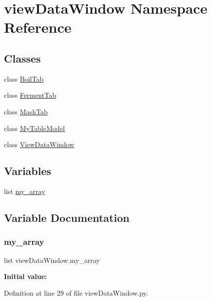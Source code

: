 \hypertarget{namespaceview_data_window}{}\section{view\+Data\+Window Namespace Reference}
\label{namespaceview_data_window}
\subsection*{Classes}
\begin{DoxyCompactItemize}
\item 
class \mbox{\hyperlink{classview_data_window_1_1_boil_tab}{Boil\+Tab}}
\item 
class \mbox{\hyperlink{classview_data_window_1_1_ferment_tab}{Ferment\+Tab}}
\item 
class \mbox{\hyperlink{classview_data_window_1_1_mash_tab}{Mash\+Tab}}
\item 
class \mbox{\hyperlink{classview_data_window_1_1_my_table_model}{My\+Table\+Model}}
\item 
class \mbox{\hyperlink{classview_data_window_1_1_view_data_window}{View\+Data\+Window}}
\end{DoxyCompactItemize}
\subsection*{Variables}
\begin{DoxyCompactItemize}
\item 
list \mbox{\hyperlink{namespaceview_data_window_a7825be9cc716cf57de01f167c3bd5132}{my\+\_\+array}}
\end{DoxyCompactItemize}


\subsection{Variable Documentation}
\mbox{\label{namespaceview_data_window_a7825be9cc716cf57de01f167c3bd5132}} 
\subsubsection{\texorpdfstring{my\_array}{my\_array}}
{\footnotesize\ttfamily list view\+Data\+Window.\+my\+\_\+array}

{\bfseries Initial value\+:}
\begin{DoxyCode}{0}
\DoxyCodeLine{1 =  [(\textcolor{stringliteral}{'1'},\textcolor{stringliteral}{'Carling'},\textcolor{stringliteral}{'01/01/19'}),}
\DoxyCodeLine{4             (\textcolor{stringliteral}{'4'},\textcolor{stringliteral}{'Asahi'},\textcolor{stringliteral}{'01/03/20'})]}

\end{DoxyCode}


Definition at line 29 of file view\+Data\+Window.\+py.

